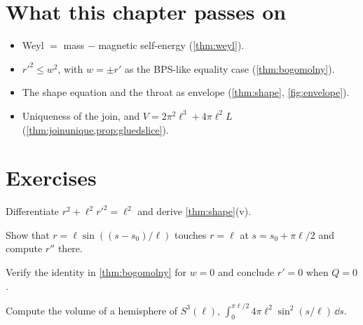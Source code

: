 \section*{What this chapter passes on}
\begin{itemize}[nosep]
\item Weyl $=$ mass $-$ magnetic self-energy (\cref{thm:weyl}).
\item $r'^2\le w^2$, with $w=\pm r'$ as the BPS-like equality case (\cref{thm:bogomolny}).
\item The shape equation and the throat as envelope (\cref{thm:shape}, \cref{fig:envelope}).
\item Uniqueness of the join, and $V=2\pi^2\ell^3+4\pi\ell^2L$ (\cref{thm:joinunique,prop:gluedslice}).
\end{itemize}

\section*{Exercises}
\begin{exercise}
Differentiate $r^2+\ell^2r'^2=\ell^2$ and derive \cref{thm:shape}(v).
\end{exercise}
\begin{exercise}
Show that $r=\ell\sin((s-s_0)/\ell)$ touches $r=\ell$ at $s=s_0+\pi\ell/2$ and compute $r''$ there.
\end{exercise}
\begin{exercise}
Verify the identity in \cref{thm:bogomolny} for $w=0$ and conclude $r'=0$ when $Q=0$.
\end{exercise}
\begin{exercise}
Compute the volume of a hemisphere of $S^3(\ell)$, $\int_0^{\pi\ell/2}4\pi\ell^2\sin^2(s/\ell)\,\dd s$.
\end{exercise}

